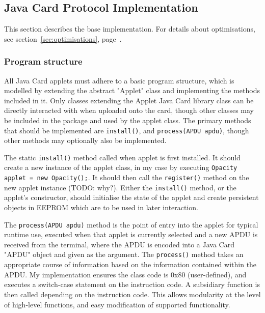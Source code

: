 \documentclass[12pt]{article}
\begin{document}
\subsection{Java Card Protocol Implementation}


This section describes the base implementation. For details about optimisations, see section~\ref{sec:optimisations}, page~\pageref{sec:optimisations}.

\subsubsection{Program structure}

All Java Card applets must adhere to a basic program structure, which is modelled by extending the abstract "Applet" class and implementing the methods included in it. Only classes extending the Applet Java Card library class can be directly interacted with when uploaded onto the card, though other classes may be included in the package and used by the applet class. The primary methods that should be implemented are \verb|install()|, and \verb|process(APDU apdu)|, though other methods may optionally also be implemented.

The static \verb|install()| method called when applet is first installed. It should create a new instance of the applet class, in my case by executing \verb|Opacity applet = new Opacity();|. It should then call the \verb|register()| method on the new applet instance (TODO: why?). Either the \verb|install()| method, or the applet's constructor, should initialise the state of the applet and create persistent objects in EEPROM which are to be used in later interaction.

The \verb|process(APDU apdu)| method is the point of entry into the applet for typical runtime use, executed when that applet is currently selected and a new APDU is received from the terminal, where the APDU is encoded into a Java Card "APDU" object and given as the argument. The \verb|process()| method takes an appropriate course of information based on the information contained within the APDU. My implementation ensures the class code is 0x80 (user-defined), and executes a switch-case statement on the instruction code. A subsidiary function is then called depending on the instruction code. This allows modularity at the level of high-level functions, and easy modification of supported functionality.
\end{document}
